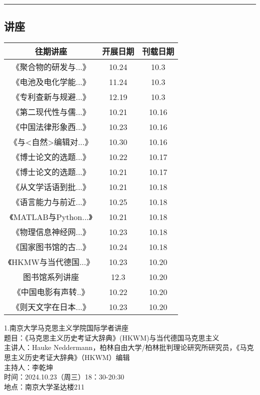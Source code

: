 \documentclass[letterpaper, 12pt]{article}
\begin{document}
\begin{multicols}{2}
{\begin{longtable}{|c|c|c|}
    \hline
\end{longtable}
\unskip
\unpenalty
\unpenalty}\unvbox\colbbox
\end{multicols}
\hrule
\pagebreak
\begin{multicols}{2}

\section{讲座}
\begin{tabular}{|c|c|c|}
    \hline
    往期讲座 & 开展日期 & 刊载日期\\
    \hline\hline
    《聚合物的研发与...》 & 10.24 & 10.3\\
    《电池及电化学能...》 & 11.24 & 10.3\\
    《专利查新与规避...》 & 12.19 & 10.3\\
    《第二现代性与儒...》& 10.21 &10.16\\
    《中国法律形象西...》 & 10.23 & 10.16\\
    《与<自然>编辑对...》 & 10.30 & 10.16\\
    《博士论文的选题...》 & 10.22 & 10.17\\
    《博士论文的选题...》 & 10.21 & 10.17\\
    《从文学话语到批...》 & 10.21 & 10.18\\
    《语言能力与前近...》 & 10.25 & 10.18\\
    《MATLAB与Python...》 & 10.21 & 10.18\\
    《物理信息神经网...》 & 10.23 & 10.18\\
    《国家图书馆的古...》 & 10.24 & 10.18\\
    《HKMW与当代德国...》 & 10.23 & 10.20\\
    图书馆系列讲座 & 12.3 & 10.20\\
    《中国电影有声转..》 & 10.22 & 10.20\\
    《则天文字在日本...》 & 10.23 & 10.20\\
    \hline
\end{tabular}

1.南京大学马克思主义学院国际学者讲座\\
题目：《马克思主义历史考证大辞典》(HKWM)与当代德国马克思主义\\
主讲人：Hauke Neddermann，柏林自由大学/柏林批判理论研究所研究员，《马克思主义历史考证大辞典》（HKWM）编辑\\
主持人：李乾坤\\
时间：2024.10.23（周三）18：30-20:30\\
地点：南京大学圣达楼211\\


\end{multicols}
\end{document}
